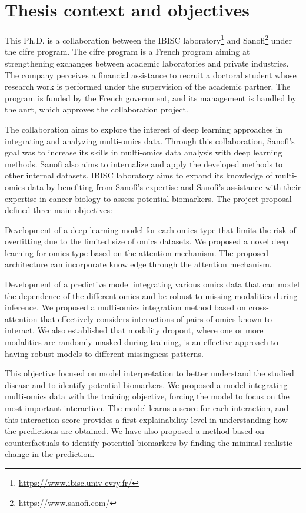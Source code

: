 \documentclass[../main.tex]{subfiles}
\begin{document}
\section{Thesis context and objectives}
	This Ph.D. is a collaboration between the IBISC laboratory\footnote{\url{https://www.ibisc.univ-evry.fr/}} and Sanofi\footnote{\url{https://www.sanofi.com/}} under the \gls{cifre} program.
	The \gls{cifre} program is a French program aiming at strengthening exchanges between academic laboratories and private industries.
	The company perceives a financial assistance to recruit a doctoral student whose research work is performed under the supervision of the academic partner.
	The program is funded by the French government, and its management is handled by the \gls{anrt}, which approves the collaboration project.

	The collaboration aims to explore the interest of deep learning approaches in integrating and analyzing multi-omics data.
	Through this collaboration, Sanofi's goal was to increase its skills in multi-omics data analysis with deep learning methods.
	Sanofi also aims to internalize and apply the developed methods to other internal datasets.
	IBISC laboratory aims to expand its knowledge of multi-omics data by benefiting from Sanofi's expertise and Sanofi's assistance with their expertise in cancer biology to assess potential biomarkers.
	The project proposal defined three main objectives:
	\begin{description}[
			style=multiline,
			leftmargin=!,
			labelwidth=2cm
		]
		\item[First objective]
			Development of a deep learning model for each omics type that limits the risk of overfitting due to the limited size of omics datasets.
			We proposed a novel deep learning for omics type based on the attention mechanism.
			The proposed architecture can incorporate knowledge through the attention mechanism.
		\item[Second objective]
			Development of a predictive model integrating various omics data that can model the dependence of the different omics and be robust to missing modalities during inference.
			We proposed a multi-omics integration method based on cross-attention that effectively considers interactions of pairs of omics known to interact.
			We also established that modality dropout, where one or more modalities are randomly masked during training, is an effective approach to having robust models to different missingness patterns.
		\item[Third objective]
			This objective focused on model interpretation to better understand the studied disease and to identify potential biomarkers.
			We proposed a model integrating multi-omics data with the training objective, forcing the model to focus on the most important interaction.
			The model learns a score for each interaction, and this interaction score provides a first explainability level in understanding how the predictions are obtained.
			We have also proposed a method based on counterfactuals to identify potential biomarkers by finding the minimal realistic change in the prediction.
	\end{description}
\end{document}

